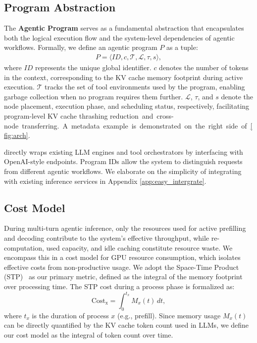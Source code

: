 \subsection{Program Abstraction}
\label{sec:program_definition}
The \textbf{Agentic Program} serves as a fundamental abstraction that encapsulates both the logical execution flow and the system-level dependencies of agentic workflows. Formally, we define an agentic program $P$ as a tuple:
\begin{align}
P = \langle \mathit{ID}, c, \mathcal{T}, \mathcal{L}, \tau, s \rangle,
\end{align}
where $\mathit{ID}$ represents the unique global identifier. $c$ denotes the number of tokens in the context, corresponding to the KV cache memory footprint during active execution. $\mathcal{T}$ tracks the set of tool environments used by the program, enabling garbage collection when no program requires them further. $\mathcal{L}$, $\tau$, and $s$ denote the node placement, execution phase, and scheduling status, respectively, facilitating program-level KV cache thrashing \mbox{reduction and cross-node transferring. A metadata example is demonstrated on the right side of \autoref{fig:arch}.}

\ouralg directly wraps existing LLM engines and tool orchestrators by interfacing with OpenAI-style endpoints. Program IDs allow the system to distinguish requests from different agentic workflows. We elaborate on the simplicity of integrating \ouralg with existing inference services in Appendix \ref{app:easy_intergrate}.

\subsection{Cost Model}
\label{sec:utility_model}

During multi-turn agentic inference, only the resources used for active prefilling and decoding contribute to the system's effective throughput, while re-computation, used capacity, and idle caching constitute resource waste. We encompass this in a cost model for GPU resource consumption, which isolates effective costs from non-productive usage. We adopt the Space-Time Product (STP)~\citep{5388441} as our primary metric, defined as the integral of the memory footprint over processing time. The STP cost during a process phase is formalized as:
\begin{equation}
    \text{Cost}_{\text{x}} = \int_{0}^{t_{x}} M_x(t) \, dt,
\end{equation}
\noindent where $t_x$ is the duration of process $x$ (e.g., prefill). Since memory usage $M_x(t)$ can be directly quantified by the KV cache token count used in LLMs, we define our cost model as the integral of token count over time.

